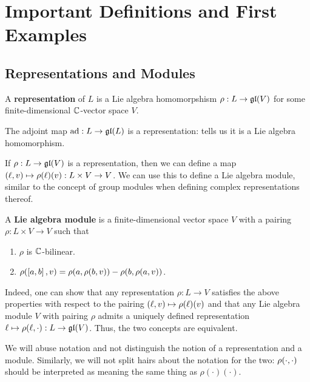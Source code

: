 \section{Important Definitions and First Examples}

\subsection{Representations and Modules}

\begin{boxdefinition}[Representation]\label{Ch2:Def:Representation}
    A \textbf{representation} of $L$ is a Lie algebra homomorpshism $\rho : L \to \mathfrak{gl}\!\left( V \right)$ for some finite-dimensional $\mathbb{C}$-vector space $V$.
\end{boxdefinition}

\begin{boxexample}
    The adjoint map $\operatorname{ad} : L \to \mathfrak{gl}\!\left( L \right)$ is a representation:  tells us it is a Lie algebra homomorphism.
\end{boxexample}

If $\rho : L \to \mathfrak{gl}\!\left( V \right)$ is a representation, then we can define a map $\left( \ell, v \right) \mapsto \rho(\ell)(v) : L \times V \to V$. We can use this to define a Lie algebra module, similar to the concept of group modules when defining complex representations thereof.

\begin{boxdefinition}\label{Ch2:Def:LieAlgModule}
    A \textbf{Lie algebra module} is a finite-dimensional vector space $V$ with a pairing $\rho : L \times V \to V$ such that
    \begin{enumerate}
        \item $\rho$ is $\mathbb{C}$-bilinear.
        \item $\rho(\left[ a, b \right], v) = \rho(a, \rho(b, v)) - \rho(b, \rho(a, v))$.
    \end{enumerate}
\end{boxdefinition}

Indeed, one can show that any representation $\rho : L \to V$ satisfies the above properties with respect to the pairing $\left( \ell, v \right) \mapsto \rho(\ell)(v)$ and that any Lie algebra module $V$ with pairing $\rho$ admits a uniquely defined representation $\ell \mapsto \rho\!\left( \ell, \cdot \right) : L \to \mathfrak{gl}\!\left( V \right)$. Thus, the two concepts are equivalent.

\begin{boxconvention}
    We will abuse notation and not distinguish the notion of a representation and a module. Similarly, we will not split hairs about the notation for the two: $\rho\!\left( \cdot, \cdot \right)$ should be interpreted as meaning the same thing as $\rho(\cdot)(\cdot)$.
\end{boxconvention}

